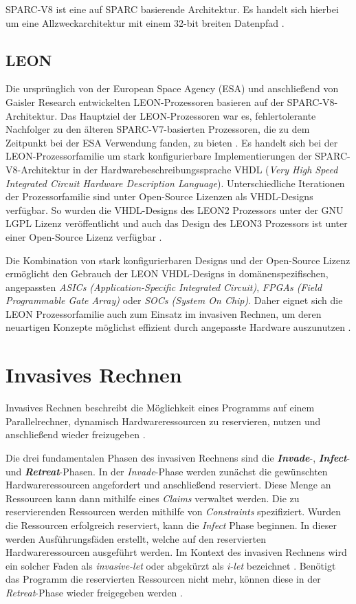 SPARC-V8 ist eine auf SPARC basierende Architektur. Es handelt sich hierbei um eine Allzweckarchitektur mit einem
32-bit breiten Datenpfad \cite{sparcv8Eval}.

\subsection{LEON}

Die ursprünglich von der European Space Agency (ESA) und anschließend von Gaisler Research entwickelten
LEON-Prozessoren basieren auf der SPARC-V8-Architektur.
Das Hauptziel der LEON-Prozessoren war es, fehlertolerante Nachfolger zu den älteren SPARC-V7-basierten
Prozessoren, die zu dem Zeitpunkt bei der ESA Verwendung fanden, zu bieten \cite{gaislerLeon}.
Es handelt sich bei der LEON-Prozessorfamilie um stark konfigurierbare
Implementierungen der SPARC-V8-Architektur in der Hardwarebeschreibungssprache
VHDL (\textit{Very High Speed Integrated Circuit Hardware Description Language}).
Unterschiedliche Iterationen der Prozessorfamilie sind unter Open-Source Lizenzen als VHDL-Designs verfügbar.
So wurden die VHDL-Designs des LEON2 Prozessors unter der GNU LGPL Lizenz veröffentlicht \cite{sparcv8Eval} und
auch das Design des LEON3 Prozessors ist unter einer Open-Source Lizenz verfügbar \cite{invasiveArrays}.

Die Kombination von stark konfigurierbaren Designs und der Open-Source Lizenz ermöglicht den Gebrauch der
LEON VHDL-Designs in domänenspezifischen, angepassten \textit{ASICs (Application-Specific Integrated Circuit)},
\textit{FPGAs (Field Programmable Gate Array)} oder \textit{SOCs (System On Chip)}.
Daher eignet sich die LEON Prozessorfamilie auch zum Einsatz im invasiven Rechnen,
um deren neuartigen Konzepte möglichst effizient durch angepasste Hardware auszunutzen \cite{sparcv8Eval}.

\section{Invasives Rechnen}

Invasives Rechnen beschreibt die Möglichkeit eines Programms auf einem Parallelrechner,
dynamisch Hardwareressourcen zu reservieren, nutzen und anschließend wieder freizugeben \cite{octopos}.

Die drei fundamentalen Phasen des invasiven Rechnens sind die \textit{\textbf{Invade}}-, \textit{\textbf{Infect}}-
und \textit{\textbf{Retreat}}-Phasen. In der \textit{Invade}-Phase werden zunächst die gewünschten
Hardwareressourcen angefordert und anschließend reserviert. Diese Menge an Ressourcen kann dann mithilfe
eines \textit{Claims} verwaltet werden. Die zu reservierenden Ressourcen werden mithilfe von \textit{Constraints}
spezifiziert.
Wurden die Ressourcen erfolgreich reserviert, kann die \textit{Infect}
Phase beginnen. In dieser werden Ausführungsfäden erstellt,
welche auf den reservierten Hardwareressourcen ausgeführt werden. Im Kontext des invasiven Rechnens wird ein solcher
Faden als \textit{invasive-let} oder abgekürzt als \textit{i-let} bezeichnet \cite{invasiveCommonTerms}.
Benötigt das Programm die reservierten Ressourcen nicht mehr, können diese in der \textit{Retreat}-Phase wieder
freigegeben werden \cite{octopos}.


